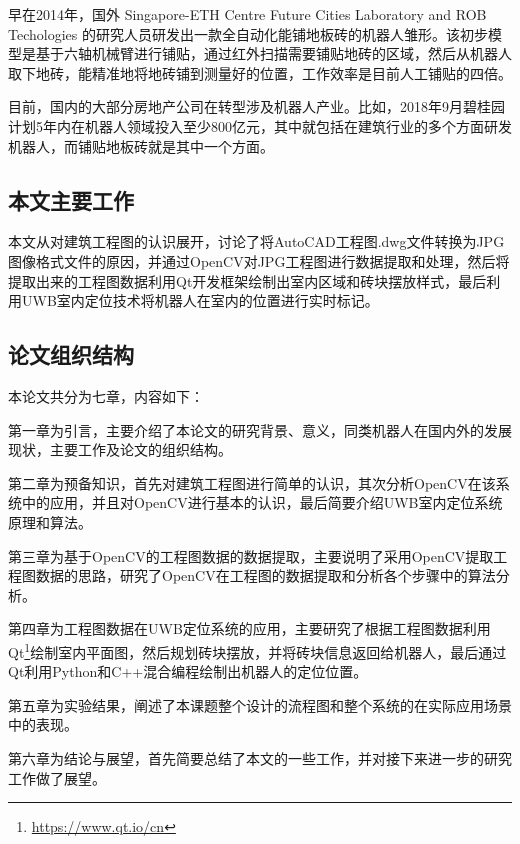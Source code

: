 早在2014年，国外 Singapore-ETH Centre Future Cities Laboratory and ROB Techologies 的研究人员研发出一款全自动化能铺地板砖的机器人雏形。该初步模型是基于六轴机械臂进行铺贴，通过红外扫描需要铺贴地砖的区域，然后从机器人取下地砖，能精准地将地砖铺到测量好的位置，工作效率是目前人工铺贴的四倍。

目前，国内的大部分房地产公司在转型涉及机器人产业。比如，2018年9月碧桂园计划5年内在机器人领域投入至少800亿元，其中就包括在建筑行业的多个方面研发机器人，而铺贴地板砖就是其中一个方面。


\subsection{本文主要工作}
本文从对建筑工程图的认识展开，讨论了将AutoCAD工程图.dwg文件转换为JPG图像格式文件的原因，并通过OpenCV对JPG工程图进行数据提取和处理，然后将提取出来的工程图数据利用Qt开发框架绘制出室内区域和砖块摆放样式，最后利用UWB室内定位技术将机器人在室内的位置进行实时标记。


\subsection{论文组织结构}
本论文共分为七章，内容如下：

第一章为引言，主要介绍了本论文的研究背景、意义，同类机器人在国内外的发展现状，主要工作及论文的组织结构。

第二章为预备知识，首先对建筑工程图进行简单的认识，其次分析OpenCV在该系统中的应用，并且对OpenCV进行基本的认识，最后简要介绍UWB室内定位系统原理和算法。

第三章为基于OpenCV的工程图数据的数据提取，主要说明了采用OpenCV提取工程图数据的思路，研究了OpenCV在工程图的数据提取和分析各个步骤中的算法分析。

第四章为工程图数据在UWB定位系统的应用，主要研究了根据工程图数据利用Qt\footnote{\url{https://www.qt.io/cn}}绘制室内平面图，然后规划砖块摆放，并将砖块信息返回给机器人，最后通过Qt利用Python和C++混合编程绘制出机器人的定位位置。

第五章为实验结果，阐述了本课题整个设计的流程图和整个系统的在实际应用场景中的表现。

第六章为结论与展望，首先简要总结了本文的一些工作，并对接下来进一步的研究工作做了展望。 